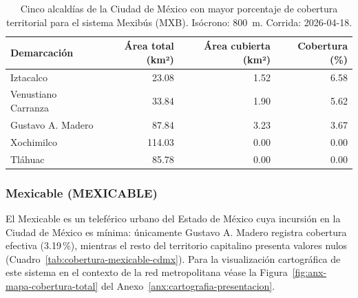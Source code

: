 \begin{table}[H]
    \centering
    \caption[Alcaldías con mayor cobertura de Mexibús (CDMX)]{
    Cinco alcaldías de la Ciudad de México con mayor porcentaje de cobertura
    territorial para el sistema Mexibús (MXB). Isócrono: 800~m.
    Corrida: 2026-04-18.}
    \label{tab:cobertura-mxb-cdmx}
    \begin{tabular}{|l|r|r|r|}
        \hline
        \textbf{Demarcación} & \textbf{Área total (km²)} & \textbf{Área cubierta (km²)} & \textbf{Cobertura (\%)} \\
        \hline
        Iztacalco           &  23.08 & 1.52 & 6.58 \\
        Venustiano Carranza &  33.84 & 1.90 & 5.62 \\
        Gustavo A. Madero   &  87.84 & 3.23 & 3.67 \\
        Xochimilco          & 114.03 & 0.00 & 0.00 \\
        Tláhuac             &  85.78 & 0.00 & 0.00 \\
        \hline
    \end{tabular}
\end{table}

\subsubsection{Mexicable (MEXICABLE)}
\label{subsubsec:cobertura-mexicable}

El Mexicable es un teleférico urbano del Estado de México cuya incursión en la
Ciudad de México es mínima: únicamente Gustavo A. Madero registra cobertura
efectiva (3.19\,\%), mientras el resto del territorio capitalino presenta valores
nulos (Cuadro~\ref{tab:cobertura-mexicable-cdmx}). Para la visualización
cartográfica de este sistema en el contexto de la red metropolitana véase la
Figura~\ref{fig:anx-mapa-cobertura-total} del
Anexo~\ref{anx:cartografia-presentacion}.

